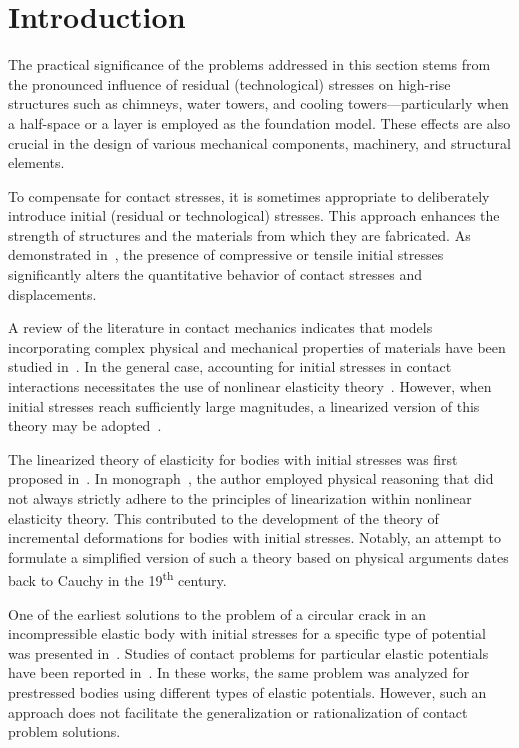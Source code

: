 \section{Introduction}

The practical significance of the problems addressed in this section stems from the pronounced influence of residual (technological) stresses on high-rise structures such as chimneys, water towers, and cooling towers—particularly when a half-space or a layer is employed as the foundation model. These effects are also crucial in the design of various mechanical components, machinery, and structural elements.

To compensate for contact stresses, it is sometimes appropriate to deliberately introduce initial (residual or technological) stresses. This approach enhances the strength of structures and the materials from which they are fabricated. As demonstrated in~\cite{YaretskaRef1}, the presence of compressive or tensile initial stresses significantly alters the quantitative behavior of contact stresses and displacements.

A review of the literature in contact mechanics indicates that models incorporating complex physical and mechanical properties of materials have been studied in~\cite{YaretskaRef2,YaretskaRef3,YaretskaRef4,YaretskaRef5,YaretskaRef6,YaretskaRef7,YaretskaRef8}. In the general case, accounting for initial stresses in contact interactions necessitates the use of nonlinear elasticity theory~\cite{YaretskaRef9}. However, when initial stresses reach sufficiently large magnitudes, a linearized version of this theory may be adopted~\cite{YaretskaRef1,YaretskaRef10,YaretskaRef11}.

The linearized theory of elasticity for bodies with initial stresses was first proposed in~\cite{YaretskaRef12}. In monograph~\cite{YaretskaRef13}, the author employed physical reasoning that did not always strictly adhere to the principles of linearization within nonlinear elasticity theory. This contributed to the development of the theory of incremental deformations for bodies with initial stresses. Notably, an attempt to formulate a simplified version of such a theory based on physical arguments dates back to Cauchy in the 19\textsuperscript{th} century.

One of the earliest solutions to the problem of a circular crack in an incompressible elastic body with initial stresses for a specific type of potential was presented in~\cite{YaretskaRef14}. Studies of contact problems for particular elastic potentials have been reported in~\cite{YaretskaRef15}. In these works, the same problem was analyzed for prestressed bodies using different types of elastic potentials. However, such an approach does not facilitate the generalization or rationalization of contact problem solutions.

